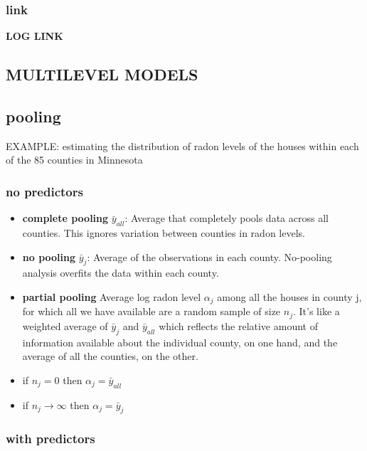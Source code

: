 \documentclass[
]{article}
\begin{document}
\hypertarget{link-3}{%
\subsubsection{link}\label{link-3}}

\textbf{LOG LINK}

\hypertarget{multilevel-models}{%
\subsection{\texorpdfstring{\textbf{MULTILEVEL
MODELS}}{MULTILEVEL MODELS}}\label{multilevel-models}}

\hypertarget{pooling}{%
\subsection{pooling}\label{pooling}}

EXAMPLE: estimating the distribution of radon levels of the houses
within each of the 85 counties in Minnesota

\hypertarget{no-predictors}{%
\subsubsection{no predictors}\label{no-predictors}}

\begin{itemize}
\item
  \textbf{complete pooling} \(\bar{y}_{all}\): Average that completely
  pools data across all counties. This ignores variation between
  counties in radon levels.
\item
  \textbf{no pooling} \(\bar{y}_{j}\): Average of the observations in
  each county. No-pooling analysis overfits the data within each county.
\item
  \textbf{partial pooling} Average log radon level \(\alpha_j\) among
  all the houses in county j, for which all we have available are a
  random sample of size \(n_j\). It's like a weighted average of
  \(\bar{y}_{j}\) and \(\bar{y}_{all}\) which reflects the relative
  amount of information available about the individual county, on one
  hand, and the average of all the counties, on the other.
\item
  if \(n_j = 0\) then \(\alpha_j = \bar{y}_{all}\)
\item
  if \(n_j \to \infty\) then \(\alpha_j = \bar{y}_{j}\)
\end{itemize}

\hypertarget{with-predictors}{%
\subsubsection{with predictors}\label{with-predictors}}
\end{document}
